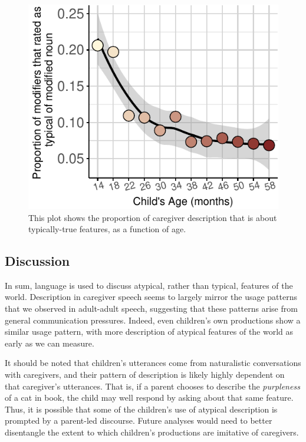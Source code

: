 \documentclass[10pt, letterpaper]{article}
\newenvironment{CodeChunk}{}{}
\begin{document}
\begin{CodeChunk}
\begin{figure}[tb]

{\centering \includegraphics{figs/prototypical_plot-1} 

}

\caption[This plot shows the proportion of caregiver description that is about typically-true features, as a function of age]{This plot shows the proportion of caregiver description that is about typically-true features, as a function of age.}\label{fig:prototypical_plot}
\end{figure}
\end{CodeChunk}

\hypertarget{discussion}{%
\subsection{Discussion}\label{discussion}}

In sum, language is used to discuss atypical, rather than typical,
features of the world. Description in caregiver speech seems to largely
mirror the usage patterns that we observed in adult-adult speech,
suggesting that these patterns arise from general communication
pressures. Indeed, even children's own productions show a similar usage
pattern, with more description of atypical features of the world as
early as we can measure.

It should be noted that children's utterances come from naturalistic
conversations with caregivers, and their pattern of description is
likely highly dependent on that caregiver's utterances. That is, if a
parent chooses to describe the \emph{purpleness} of a cat in book, the
child may well respond by asking about that same feature. Thus, it is
possible that some of the children's use of atypical description is
prompted by a parent-led discourse. Future analyses would need to better
disentangle the extent to which children's productions are imitative of
caregivers.
\end{document}
